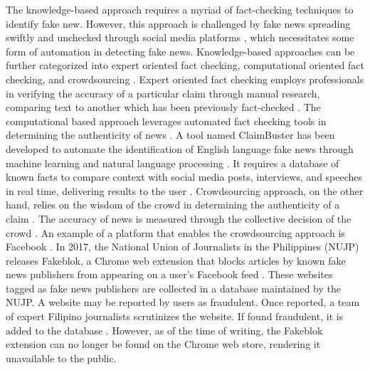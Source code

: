 The knowledge-based approach requires a myriad of fact-checking techniques to identify fake new. However, this approach is challenged by fake news spreading swiftly and unchecked through social media platforms \cite{qazvinian2011rumor}, which necessitates some form of automation in detecting fake news. Knowledge-based approaches can be further categorized into expert oriented fact checking, computational oriented fact checking, and crowdsourcing \cite{debeer2020approaches}. Expert oriented fact checking employs professionals in verifying the accuracy of a particular claim through manual research, comparing text to another which has been previously fact-checked \cite{vlachos2014factchecking}.  The computational based approach leverages automated fact checking tools in determining the authenticity of news \cite{ahmed2019combining}. A tool named ClaimBuster \cite{claimbuster, hassan2017proposal} has been developed to automate the identification of English language fake news through machine learning and natural language processing \cite{hassan2017toward}. It requires a database of known facts to compare context with social media posts, interviews, and speeches in real time, delivering results to the user \cite{hassan2017toward}. Crowdsourcing approach, on the other hand, relies on the wisdom of the crowd in determining the authenticity of a claim \cite{ahmed2019combining}. The accuracy of news is measured through the collective decision of the crowd \cite{pennycook2019fighting}. An example of a platform that enables the crowdsourcing approach is Facebook \cite{tschiatschek2017detecting}. In 2017, the National Union of Journalists in the Philippines (NUJP) releases Fakeblok, a Chrome web extension that blocks articles by known fake news publishers from appearing on a user's Facebook feed \cite{inquirer-fakeblok, rappler-fakeblok}. These websites tagged as fake news publishers are collected in a database maintained by the NUJP. A website may be reported by users as fraudulent. Once reported, a team of expert Filipino journalists scrutinizes the website. If found fraudulent, it is added to the database \cite{cdi-fakeblok}. However, as of the time of writing, the Fakeblok extension can no longer be found on the Chrome web store, rendering it unavailable to the public.

